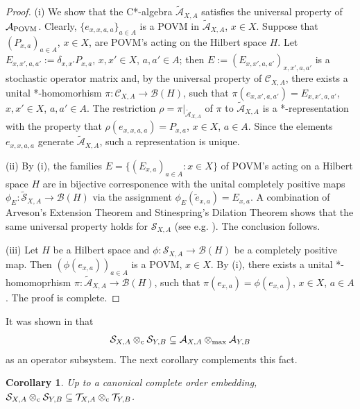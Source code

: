 \documentclass[11pt]{amsart}
\newtheorem{corollary}[theorem]{Corollary}
\theoremstyle{definition}
\newcommand{\cl}[1]{\mathcal{#1}}
\begin{document}
\begin{proof}
(i) 
We show that the C*-algebra $\tilde{\cl A}_{X,A}$ satisfies the universal property 
of $\cl A_{\rm POVM}$. 
Clearly, $\{e_{x,x,a,a}\}_{a\in A}$ is a POVM in $\tilde{\cl A}_{X,A}$, $x\in X$. 
Suppose that $(P_{x,a})_{a\in A}$, $x\in X$, are POVM's acting on the Hilbert space $H$. 
Let $E_{x,x',a,a'} := \delta_{x,x'} P_{x,a}$, $x,x'\in X$, $a,a'\in A$; then 
$E := (E_{x,x',a,a'})_{x,x',a,a'}$ is a stochastic operator matrix and, by the universal property 
of $\cl C_{X,A}$, there exists a unital *-homomorhism $\pi : \cl C_{X,A}\to \cl B(H)$, such that 
$\pi(e_{x,x',a,a'}) = E_{x,x',a,a'}$, $x,x'\in X$, $a,a'\in A$. 
The restriction $\rho = \pi|_{\tilde{\cl A}_{X,A}}$ of $\pi$ to $\tilde{\cl A}_{X,A}$
is a *-representation with the property that $\rho(e_{x,x,a,a}) = P_{x,a}$, $x\in X$, $a\in A$. 
Since the elements $e_{x,x,a,a}$ generate $\tilde{\cl A}_{X,A}$, such a representation is unique. 


(ii) 
By (i), the families $E = \{(E_{x,a})_{a\in A} : x\in X\}$ of POVM's
acting on a Hilbert space $H$ are in bijective corresponence
with the unital completely positive maps 
$\phi_E : \tilde{\cl S}_{X,A} \to \cl B(H)$ 
via the assignment $\phi_E(\tilde{e}_{x,a}) = E_{x,a}$. 
A combination of Arveson's Extension Theorem and 
Stinespring's Dilation Theorem shows that the same 
universal property holds for $\cl S_{X,A}$ (see e.g.
\cite[p. 680]{pt}). The conclusion follows. 


(iii) 
Let $H$ be a Hilbert space and $\phi : \cl S_{X,A}\to \cl B(H)$ be a 
completely positive map. Then $(\phi(e_{x,a}))_{a\in A}$ is a POVM, $x\in X$.
By (i), there exists a unital *-homomoprhism $\pi : \tilde{\cl A}_{X,A}\to \cl B(H)$, such that 
$\pi(e_{x,a}) = \phi(e_{x,a})$, $x\in X$, $a\in A$. 
The proof is complete. 
\end{proof}


It was shown in \cite[Lemma 2.8]{pt} that 
$$\cl S_{X,A}\otimes_{\rm c} \cl S_{Y,B} \subseteq \cl A_{X,A}\otimes_{\max} \cl A_{Y,B}$$
as an operator subsystem. 
The next corollary complements this fact. 





\begin{corollary}\label{c_cincl}
Up to a canonical complete order embedding, 
$\cl S_{X,A}\otimes_{\rm c} \cl S_{Y,B} \subseteq 
\cl T_{X,A}\otimes_{\rm c} \cl T_{Y,B}$.
\end{corollary}
\end{document}
